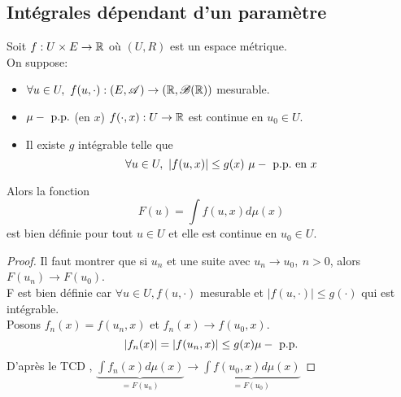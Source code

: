 \subsection{Intégrales dépendant d'un paramètre}

\begin{theorem}
	Soit $f : U \times E \to \mathbb{R}$ où $(U,R)$ est un espace métrique.\\
	On suppose:
	\begin{itemize}
		\item $\forall u \in U,\ f (u, \cdot) : (E, \mathscr{A}) \to (\mathbb{R}, \mathscr{B}(\mathbb{R}))$ mesurable.
		\item $\mu-\text{ p.p.}$ (en $x$) $f(\cdot, x) : U  \to \mathbb{R}$ est continue en $u_0 \in U$.
		\item Il existe $g$ intégrable telle que
		      $$\forall u \in U, \ \left| f(u,x) \right| \leq g(x) \ \mupp \text{ en } x$$
	\end{itemize}
	Alors la fonction
	$$F (u) = \int f(u,x) d\mu(x)$$
	est bien définie pour tout $u \in U$ et elle est continue en $u_0 \in U$.
\end{theorem}


\begin{proof}
	Il faut montrer que si $u_n$ et une suite avec $u_n \to u_0, \ n > 0$, alors $F(u_n) \to F(u_0)$.\\
	F est bien définie car $\forall u \in U, f(u,\cdot)$ mesurable et $|f(u,\cdot)| \leq g(\cdot)$ qui est intégrable.\\

	Posons $f_n(x) = f(u_n,x)$ et $f_n(x) \to f(u_0,x)$.\\
	$$|f_n(x)|= |f(u_n, x)| \leq g(x) \mu-\text{ p.p.}$$
	D'après le TCD , $\underbrace{\int f_n(x)d\mu(x)}_{=F(u_n)} \to  \underbrace{\int f(u_0, x)d\mu(x)}_{= F(u_0)}$
\end{proof}

